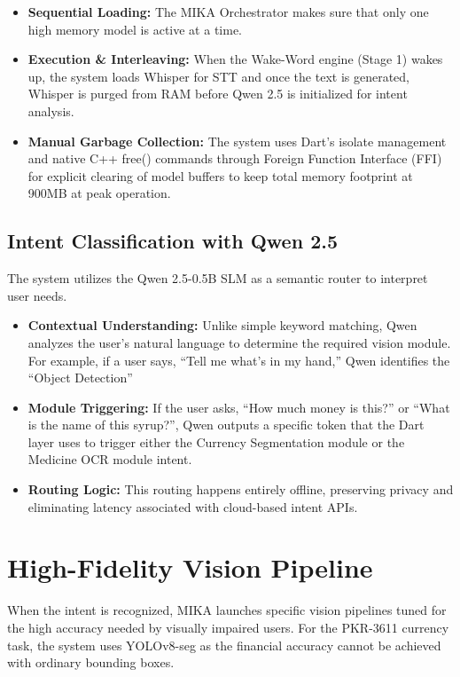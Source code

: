 \documentclass[12pt,a4paper]{report}
\begin{document}
\begin{itemize}
    \item[1.] \textbf{Sequential Loading:} The MIKA Orchestrator makes sure that only one high memory model is active at a time.
 
    \item[2.] \textbf{Execution \& Interleaving:} When the Wake-Word engine (Stage 1) wakes up, the system loads Whisper for STT and once the text is generated, Whisper is purged from RAM before Qwen 2.5 is initialized for intent analysis.
 
    \item[3.] \textbf{Manual Garbage Collection:}  The system uses Dart's isolate management and native C++ free() commands through Foreign Function Interface (FFI) for explicit clearing of model buffers to keep total memory footprint at 900MB at peak operation.
\end{itemize}
 
\subsection{Intent Classification with Qwen 2.5}
The system utilizes the Qwen 2.5-0.5B SLM as a semantic router to interpret user needs.
 
\begin{itemize}
    \item[1.] \textbf{Contextual Understanding:} Unlike simple keyword matching, Qwen analyzes the user’s natural language to determine the required vision module. For example, if a user says, “Tell me what’s in my hand,” Qwen identifies the “Object Detection”
    \item[2.] \textbf{Module Triggering:}  If the user asks, “How much money is this?” or “What is the name of this syrup?”, Qwen outputs a specific token that the Dart layer uses to trigger either the Currency Segmentation module or the Medicine OCR module intent.
 
    \item[3.] \textbf{Routing Logic:} This routing happens entirely offline, preserving privacy and eliminating latency associated with cloud-based intent APIs.
\end{itemize}
 
\section{High-Fidelity Vision Pipeline}
When the intent is recognized, MIKA launches specific vision pipelines tuned for the high accuracy needed by visually impaired users. For the PKR-3611 currency task, the system uses YOLOv8-seg as the financial accuracy cannot be achieved with ordinary bounding boxes.  
\end{document}
